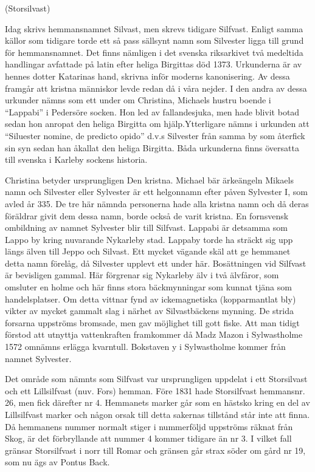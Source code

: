 
  (Storsilvast)

Idag skrivs hemmansnamnet Silvast, men skrevs tidigare Silfvast. Enligt samma källor som tidigare torde ett så pass sällsynt namn som Silvester ligga till grund för hemmansnamnet. Det finns nämligen  i det svenska riksarkivet två medeltida handlingar avfattade på latin efter heliga Birgittas död 1373. Urkunderna är av hennes dotter Katarinas hand, skrivna inför moderns kanonisering. Av dessa framgår att kristna människor levde redan då i våra nejder. I den andra av dessa urkunder nämns som ett under om Christina, Michaels hustru boende i ``Lappabi'' i Pedersöre socken. Hon led av fallandesjuka, men hade blivit botad sedan hon anropat den heliga Birgitta om hjälp.Ytterligare nämns i urkunden att ``Siluester nomine, de predicto opido'' d.v.s Silvester från samma by som återfick sin syn sedan han åkallat den heliga Birgitta. Båda urkunderna finns översatta till svenska i Karleby sockens historia.

Christina betyder ursprungligen Den kristna. Michael bär ärkeängeln Mikaels namn och Silvester eller Sylvester är ett helgonnamn efter påven Sylvester I, som avled år 335. De tre här nämnda personerna hade alla kristna namn och då deras föräldrar givit dem dessa namn, borde också de varit kristna. En fornsvensk ombildning av namnet Sylvester blir till Silfvast. Lappabi är detsamma som Lappo by kring nuvarande Nykarleby stad. Lappaby torde ha sträckt sig upp längs älven till Jeppo och Silvast. Ett mycket vägande skäl att ge  hemmanet detta namn förelåg, då Silvester upplevt ett under här. Bosättningen vid Silfvast är bevisligen gammal. Här förgrenar sig Nykarleby älv i två älvfåror, som omsluter en holme och här finns stora bäckmynningar som kunnat tjäna som handelsplatser. Om detta vittnar fynd av ickemagnetiska (kopparmantlat bly) vikter av mycket gammalt slag i närhet av Silvastbäckens mynning. De strida forsarna uppströms bromsade, men gav möjlighet till gott fiske. Att man tidigt förstod att utnyttja vattenkraften framkommer då Madz Mazon i Sylwastholme 1572 omnämns erlägga kvarntull. Bokstaven y i Sylwastholme kommer från namnet Sylvester.

Det område som nämnts som Silfvast var ursprungligen uppdelat i ett Storsilvast och ett Lillsilfvast (nuv. Fors) hemman. Före 1831 hade Storsilfvast hemmansnr. 26, men fick därefter nr 4. Hemmanets marker går som en hästsko kring en del av Lillsilfvast marker och någon orsak till detta sakernas tillstånd står inte att finna. Då hemmanens nummer normalt stiger i nummerföljd uppströms räknat från Skog, är det förbryllande att nummer 4 kommer tidigare än nr 3. I vilket fall gränsar Storsilfvast i norr till Romar och gränsen går strax söder om gård nr 19, som nu ägs av Pontus Back.

